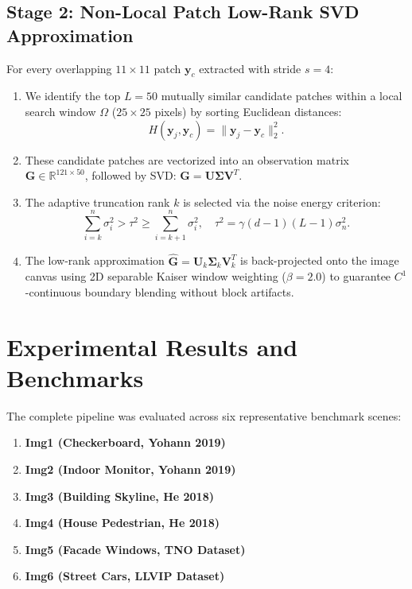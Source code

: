 \documentclass[journal]{IEEEtran}
\begin{document}
\subsection{Stage 2: Non-Local Patch Low-Rank SVD Approximation}
For every overlapping $11 \times 11$ patch $\mathbf{y}_c$ extracted with stride $s = 4$:
\begin{enumerate}
    \item We identify the top $L = 50$ mutually similar candidate patches within a local search window $\Omega$ ($25 \times 25$ pixels) by sorting Euclidean distances:
    \begin{equation}
        H(\mathbf{y}_j, \mathbf{y}_c) = \|\mathbf{y}_j - \mathbf{y}_c\|_2^2.
    \end{equation}
    \item These candidate patches are vectorized into an observation matrix $\mathbf{G} \in \mathbb{R}^{121 \times 50}$, followed by SVD: $\mathbf{G} = \mathbf{U} \mathbf{\Sigma} \mathbf{V}^T$.
    \item The adaptive truncation rank $k$ is selected via the noise energy criterion:
    \begin{equation}
        \sum_{i=k}^n \sigma_i^2 > \tau^2 \ge \sum_{i=k+1}^n \sigma_i^2, \quad \tau^2 = \gamma (d - 1)(L - 1) \sigma_n^2.
        \label{eq:noise_energy_criterion}
    \end{equation}
    \item The low-rank approximation $\hat{\mathbf{G}} = \mathbf{U}_k \mathbf{\Sigma}_k \mathbf{V}_k^T$ is back-projected onto the image canvas using 2D separable Kaiser window weighting ($\beta = 2.0$) to guarantee $C^1$-continuous boundary blending without block artifacts.
\end{enumerate}

\section{Experimental Results and Benchmarks}
\label{sec:experiments}

The complete pipeline was evaluated across six representative benchmark scenes:
\begin{enumerate}
    \item \textbf{Img1 (Checkerboard, Yohann 2019)}~\cite{yohann2019dataset}
    \item \textbf{Img2 (Indoor Monitor, Yohann 2019)}~\cite{yohann2019dataset}
    \item \textbf{Img3 (Building Skyline, He 2018)}~\cite{he2018dlsnuc}
    \item \textbf{Img4 (House Pedestrian, He 2018)}~\cite{he2018dlsnuc}
    \item \textbf{Img5 (Facade Windows, TNO Dataset)}
    \item \textbf{Img6 (Street Cars, LLVIP Dataset)}~\cite{jia2021llvip}
\end{enumerate}
\end{document}
